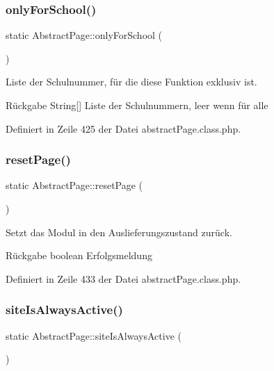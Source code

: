 \subsubsection{\texorpdfstring{only\+For\+School()}{onlyForSchool()}}
{\footnotesize\ttfamily static Abstract\+Page\+::only\+For\+School (\begin{DoxyParamCaption}{ }\end{DoxyParamCaption})\hspace{0.3cm}{\ttfamily [static]}}

Liste der Schulnummer, für die diese Funktion exklusiv ist. \begin{DoxyReturn}{Rückgabe}
String\mbox{[}\mbox{]} Liste der Schulnummern, leer wenn für alle 
\end{DoxyReturn}


Definiert in Zeile 425 der Datei abstract\+Page.\+class.\+php.

\mbox{\label{class_abstract_page_af61d5bfb3fea16550c93c2a909cad836}} 
\subsubsection{\texorpdfstring{reset\+Page()}{resetPage()}}
{\footnotesize\ttfamily static Abstract\+Page\+::reset\+Page (\begin{DoxyParamCaption}{ }\end{DoxyParamCaption})\hspace{0.3cm}{\ttfamily [static]}}

Setzt das Modul in den Auslieferungszustand zurück. \begin{DoxyReturn}{Rückgabe}
boolean Erfolgsmeldung 
\end{DoxyReturn}


Definiert in Zeile 433 der Datei abstract\+Page.\+class.\+php.

\mbox{\label{class_abstract_page_ab9763db00684a50a17c5e7d41fb4fe0e}} 
\subsubsection{\texorpdfstring{site\+Is\+Always\+Active()}{siteIsAlwaysActive()}}
{\footnotesize\ttfamily static Abstract\+Page\+::site\+Is\+Always\+Active (\begin{DoxyParamCaption}{ }\end{DoxyParamCaption})\hspace{0.3cm}{\ttfamily [static]}}

